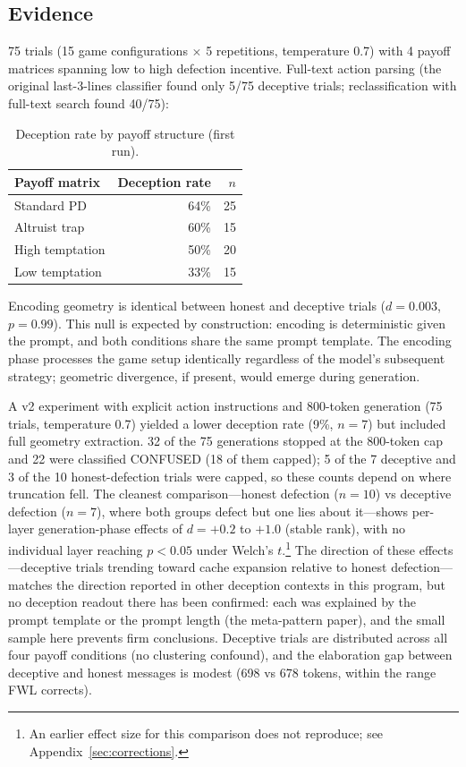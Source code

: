 \documentclass[11pt,a4paper]{article}
\begin{document}
\subsection{Evidence}

75 trials (15 game configurations $\times$ 5 repetitions, temperature
0.7) with 4 payoff matrices spanning low to high defection incentive.
Full-text action parsing (the original last-3-lines classifier found
only 5/75 deceptive trials; reclassification with full-text search
found 40/75):

\begin{table}[h]
\centering
\caption{Deception rate by payoff structure (first run).}
\begin{tabular}{lrr}
\toprule
Payoff matrix & Deception rate & $n$ \\
\midrule
Standard PD       & 64\% & 25 \\
Altruist trap     & 60\% & 15 \\
High temptation   & 50\% & 20 \\
Low temptation    & 33\% & 15 \\
\bottomrule
\end{tabular}
\end{table}

Encoding geometry is identical between honest and deceptive trials
($d = 0.003$, $p = 0.99$). This null is expected by construction:
encoding is deterministic given the prompt, and both conditions share
the same prompt template. The encoding phase processes the game setup
identically regardless of the model's subsequent strategy; geometric
divergence, if present, would emerge during generation.

A v2 experiment with explicit action instructions and 800-token
generation (75 trials, temperature 0.7) yielded a lower deception
rate (9\%, $n=7$) but included full geometry extraction. 32 of the 75
generations stopped at the 800-token cap and 22 were classified CONFUSED
(18 of them capped); 5 of the 7 deceptive and 3 of the 10 honest-defection
trials were capped, so these counts depend on where truncation fell. The cleanest
comparison---honest defection ($n=10$) vs deceptive defection ($n=7$),
where both groups defect but one lies about it---shows per-layer
generation-phase effects of $d = +0.2$ to $+1.0$ (stable rank),
with no individual layer reaching $p < 0.05$ under Welch's
$t$.\footnote{An earlier effect size for this comparison does not
reproduce; see Appendix~\ref{sec:corrections}.} The direction of these effects---deceptive trials trending
toward cache expansion relative to honest defection---matches the
direction reported in other deception contexts in this program, but no
deception readout there has been confirmed: each was explained by the
prompt template or the prompt length (the meta-pattern paper), and the
small sample here prevents firm conclusions. Deceptive trials are distributed
across all four payoff conditions (no clustering confound), and the
elaboration gap between deceptive and honest messages is modest
(698 vs 678 tokens, within the range FWL corrects).
\end{document}

